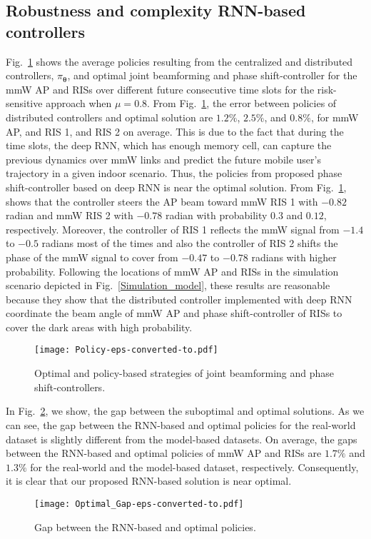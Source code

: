 \documentclass[conference]{IEEEtran}
\begin{document}
\subsection{Robustness and complexity RNN-based controllers}
Fig.~\ref{Policy} shows the average policies resulting from the centralized and distributed controllers, $\pi_{\boldsymbol{\theta}}$, and optimal joint beamforming and phase shift-controller for the mmW AP and RISs over different future consecutive time slots for the risk-sensitive approach when $\mu=0.8$. From Fig.~\ref{Policy}, the error between policies of distributed controllers and optimal solution are $1.2\%$, $2.5\%$, and $0.8\%$, for mmW AP, and RIS 1, and RIS 2 on average. This is due to the fact that during the time slots, the deep RNN, which has enough memory cell, can capture the previous dynamics over mmW links and predict the future mobile user's trajectory in a given indoor scenario. Thus, the policies from proposed phase shift-controller based on deep RNN is near the optimal solution. From Fig.~\ref{Policy}, shows that the controller steers the AP beam toward mmW RIS 1 with $-0.82$ radian and mmW RIS 2 with $-0.78$ radian with probability $0.3$ and $0.12$, respectively. Moreover, the controller of RIS 1 reflects the mmW signal from $-1.4$ to $-0.5$ radians most of the times and also the controller of RIS 2 shifts the phase of the mmW signal to cover from $-0.47$ to $-0.78$ radians with higher probability. Following the locations of mmW AP and RISs in the simulation scenario depicted in Fig.~\ref{Simulation_model}, these results are reasonable because they show that the distributed controller implemented with deep RNN coordinate the beam angle of mmW AP and phase shift-controller of RISs to cover the dark areas with high probability.
\begin{figure}[t!]
  \centering
  \texttt{[image: Policy-eps-converted-to.pdf]}
  \caption{Optimal and policy-based strategies of joint beamforming and phase shift-controllers.} \vspace{-0.4cm}
  \label{Policy}
\end{figure}

In Fig.~\ref{Optimal_Gap}, we show, the gap between the suboptimal and optimal solutions. As we can see, the gap between the RNN-based and optimal policies for the real-world dataset is slightly different from the model-based datasets. On average, the gaps between the RNN-based and optimal policies of mmW AP and RISs are $1.7\%$ and $1.3\%$ for the real-world and the model-based dataset, respectively. Consequently, it is clear that our proposed RNN-based solution is near optimal.
\begin{figure}[t!]
  \centering
  \texttt{[image: Optimal\_Gap-eps-converted-to.pdf]}
  \caption{Gap between the RNN-based and optimal policies.}
  \vspace{-0.9cm}
  \label{Optimal_Gap}
\end{figure}
\end{document}
